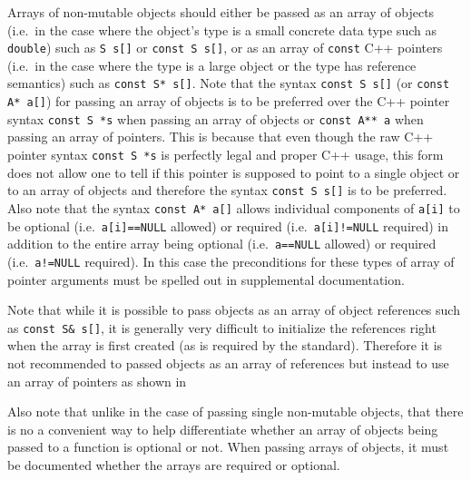 Arrays of non-mutable objects should either be passed as an array of
objects (i.e.~in the case where the object's type is a small concrete
data type such as {}\texttt{double}) such as {}\texttt{S s[]} or
{}\texttt{const S s[]}, or as an array of {}\texttt{const} C++
pointers (i.e.~in the case where the type is a large object or the
type has reference semantics) such as {}\texttt{const S* s[]}.  Note
that the syntax {}\texttt{const S s[]} (or {}\texttt{const A* a[]})
for passing an array of objects is to be preferred over the C++
pointer syntax {}\texttt{const S *s} when passing an array of objects
or {}\texttt{const A** a} when passing an array of pointers.  This is
because that even though the raw C++ pointer syntax {}\texttt{const S
*s} is perfectly legal and proper C++ usage, this form does not allow
one to tell if this pointer is supposed to point to a single object or
to an array of objects and therefore the syntax {}\texttt{const S s[]}
is to be preferred.  Also note that the syntax {}\texttt{const A* a[]}
allows individual components of {}\texttt{a[i]} to be optional
(i.e.~{}\texttt{a[i]==NULL} allowed) or required
(i.e.~{}\texttt{a[i]!=NULL} required) in addition to the entire array
being optional (i.e.~{}\texttt{a==NULL} allowed) or required
(i.e.~{}\texttt{a!=NULL} required).  In this case the preconditions
for these types of array of pointer arguments must be spelled out in
supplemental documentation.

Note that while it is possible to pass objects as an array of object
references such as {}\texttt{const S\& s[]}, it is generally very
difficult to initialize the references right when the array is first
created (as is required by the standard).  Therefore it is not
recommended to passed objects as an array of references but instead to
use an array of pointers as shown in {}\cite[Appendix
D]{ref:RefCountPtrBeginnersGuide}

Also note that unlike in the case of passing single non-mutable
objects, that there is no a convenient way to help differentiate
whether an array of objects being passed to a function is optional or
not.  When passing arrays of objects, it must be documented whether
the arrays are required or optional.


